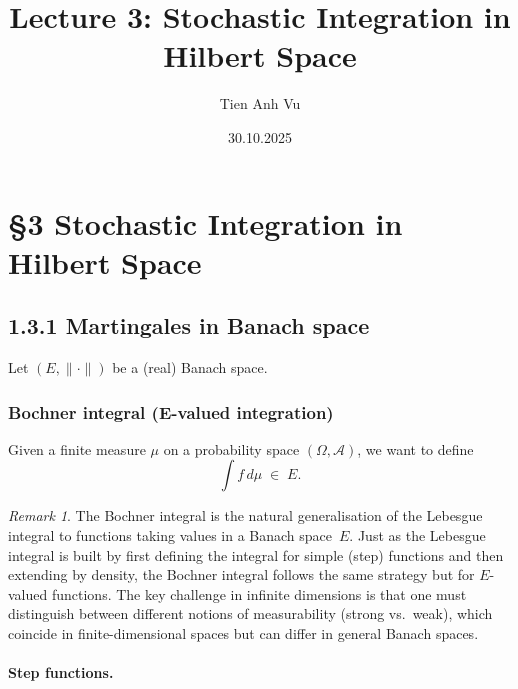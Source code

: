 \documentclass[11pt]{article}
\title{Lecture 3: Stochastic Integration in Hilbert Space}
\date{30.10.2025}
\author{Tien Anh Vu}
\theoremstyle{definition}
\theoremstyle{remark}
\newtheorem{remark}{Remark}
\begin{document}
\maketitle

\section*{\S 3 Stochastic Integration in Hilbert Space}

\subsection*{1.3.1 Martingales in Banach space}

Let $(E, \|\cdot\|)$ be a (real) Banach space.

\subsubsection*{Bochner integral (E-valued integration)}


Given a finite measure $\mu$ on a probability space $(\Omega, \mathcal{A})$,
we want to define
\[
    \int f\,d\mu \;\in\; E.
\]

\begin{remark}
The Bochner integral is the natural generalisation of the Lebesgue integral to functions taking values in a Banach space~$E$.  Just as the Lebesgue integral is built by first defining the integral for simple (step) functions and then extending by density, the Bochner integral follows the same strategy but for $E$-valued functions.  The key challenge in infinite dimensions is that one must distinguish between different notions of measurability (strong vs.\ weak), which coincide in finite-dimensional spaces but can differ in general Banach spaces.
\end{remark}

\paragraph{Step functions.}
\end{document}
